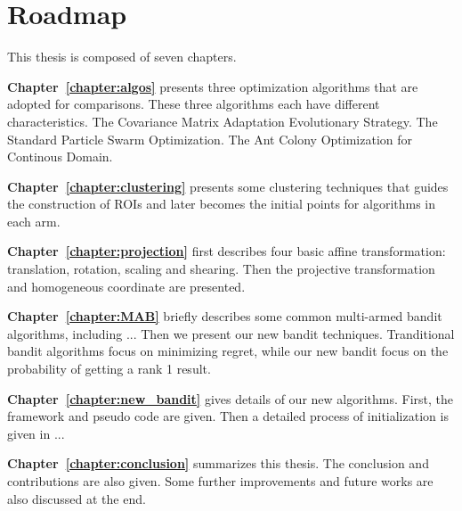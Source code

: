 \section{Roadmap}
This thesis is composed of seven chapters.


\textbf{Chapter~\ref{chapter:algos}} presents three optimization algorithms that are adopted for comparisons. 
These three algorithms each have different characteristics. 
The Covariance Matrix Adaptation Evolutionary Strategy.
The Standard Particle Swarm Optimization.
The Ant Colony Optimization for Continous Domain.


\textbf{Chapter~\ref{chapter:clustering}} presents some clustering techniques that guides the construction of ROIs and later becomes the initial points for algorithms in each arm.


\textbf{Chapter~\ref{chapter:projection}} first describes four basic affine transformation: translation, rotation, scaling and shearing.
Then the projective transformation and homogeneous coordinate are presented.


\textbf{Chapter~\ref{chapter:MAB}} briefly describes some common multi-armed bandit algorithms, including ...
Then we present our new bandit techniques.
Tranditional bandit algorithms focus on minimizing regret, while our new bandit focus on the probability of getting a rank 1 result.


\textbf{Chapter~\ref{chapter:new_bandit}} gives details of our new algorithms.
First, the framework and pseudo code are given.
Then a detailed process of initialization is given in ...

\textbf{Chapter~\ref{chapter:conclusion}} summarizes this thesis. 
The conclusion and contributions are also given.
Some further improvements and future works are also discussed at the end.


